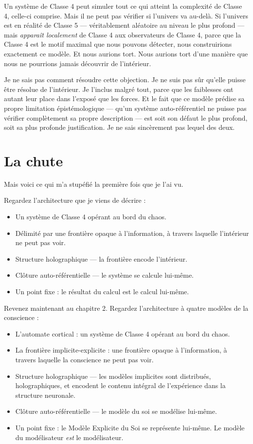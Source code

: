 \documentclass[11pt, twoside, openright]{book}
\begin{document}
Un système de Classe 4 peut simuler tout ce qui atteint la complexité de Classe 4, celle-ci comprise. Mais il ne peut pas vérifier si l'univers va au-delà. Si l'univers est en réalité de Classe 5 --- véritablement aléatoire au niveau le plus profond --- mais \textit{apparaît localement} de Classe 4 aux observateurs de Classe 4, parce que la Classe 4 est le motif maximal que nous pouvons détecter, nous construirions exactement ce modèle. Et nous aurions tort. Nous aurions tort d'une manière que nous ne pourrions jamais découvrir de l'intérieur.

Je ne sais pas comment résoudre cette objection. Je ne suis pas sûr qu'elle puisse être résolue de l'intérieur. Je l'inclus malgré tout, parce que les faiblesses ont autant leur place dans l'exposé que les forces. Et le fait que ce modèle prédise sa propre limitation épistémologique --- qu'un système auto-référentiel ne puisse pas vérifier complètement sa propre description --- est soit son défaut le plus profond, soit sa plus profonde justification. Je ne sais sincèrement pas lequel des deux.


\section*{La chute}

Mais voici ce qui m'a stupéfié la première fois que je l'ai vu.

Regardez l'architecture que je viens de décrire :

\begin{itemize}
  \item Un système de Classe 4 opérant au bord du chaos.
  \item Délimité par une frontière opaque à l'information, à travers laquelle l'intérieur ne peut pas voir.
  \item Structure holographique --- la frontière encode l'intérieur.
  \item Clôture auto-référentielle --- le système se calcule lui-même.
  \item Un point fixe : le résultat du calcul est le calcul lui-même.
\end{itemize}

Revenez maintenant au chapitre 2. Regardez l'architecture à quatre modèles de la conscience :

\begin{itemize}
  \item L'automate cortical : un système de Classe 4 opérant au bord du chaos.
  \item La frontière implicite-explicite : une frontière opaque à l'information, à travers laquelle la conscience ne peut pas voir.
  \item Structure holographique --- les modèles implicites sont distribués, holographiques, et encodent le contenu intégral de l'expérience dans la structure neuronale.
  \item Clôture auto-référentielle --- le modèle du soi se modélise lui-même.
  \item Un point fixe : le Modèle Explicite du Soi se représente lui-même. Le modèle du modélisateur \textit{est} le modélisateur.
\end{itemize}
\end{document}
